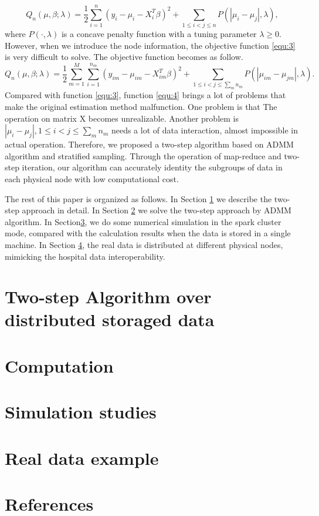 \documentclass[review]{elsarticle}
\begin{document}
\begin{equation}
\label{equ:3}
Q_n(\mu, \beta;\lambda) = \frac{1}{2}\sum_{i=1}^n(y_i-\mu_i-X_i^T\beta)^2+\sum_{1\leq i<j\leq n}P(|\mu_i-\mu_j|,\lambda),
\end{equation}
where $P(\cdot,\lambda)$ is a concave penalty function with a tuning parameter $\lambda\geq0$. However, when we introduce the node information, the objective function \ref{equ:3} is very difficult to solve. The objective function becomes
as follow.
\begin{equation}
\label{equ:4}
Q_n(\mu, \beta;\lambda) = \frac{1}{2}\sum_{m=1}^M\sum_{i=1}^{n_m}(y_{im}-\mu_{im}-X_{im}^T\beta)^2+\sum_{1\leq i<j\leq \sum_m{n_m}}P(|\mu_{im}-\mu_{jm}|,\lambda).
\end{equation}
Compared with function \ref{equ:3}, function \ref{equ:4} brings a lot of problems that make the original estimation method malfunction. One problem is that The operation on matrix X becomes unrealizable. Another problem is $|\mu_i-\mu_j|, 1\leq i<j\leq \sum_m{n_m}$ needs a lot of data interaction, almost impossible in actual operation. Therefore, we proposed a two-step algorithm based on ADMM algorithm and stratified sampling. Through the operation of map-reduce and two-step iteration, our algorithm can accurately identity the subgroups of data in each physical node with low computational cost.

The rest of this paper is organized as follows. In Section \ref{sec:2} we describe the two-step approach in detail. In Section \ref{sec:3} we solve the two-step approach by ADMM algorithm. In Section\ref{sec:4}, we do some numerical simulation in the spark cluster mode, compared with the calculation results when the data is stored in a single machine. In Section \ref{sec:5}, the real data is distributed at different physical nodes, mimicking the hospital data interoperability.

\section{Two-step Algorithm over distributed storaged data}\label{sec:2}

\section{Computation}\label{sec:3}

\section{Simulation studies}\label{sec:4}

\section{Real data example}\label{sec:5}
\section*{References}


\end{document}
